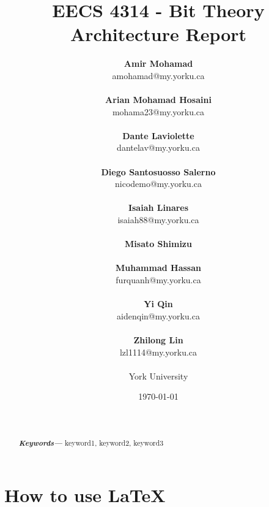 \documentclass[12pt, dvipsnames, a4paper]{article}
\providecommand{\keywords}[1]
{
  \small	
  \textbf{\textit{Keywords---}} #1
}
\begin{document}
\title{\textbf{EECS 4314 - Bit Theory\\Architecture Report}}
\date{\Large \today}
\author{
	\small \textbf{Amir Mohamad}\\ amohamad@my.yorku.ca\\\\
	\small \textbf{Arian Mohamad Hosaini}\\ mohama23@my.yorku.ca\\\\
	\small \textbf{Dante Laviolette}\\ dantelav@my.yorku.ca\\\\
	\small \textbf{Diego Santosuosso Salerno}\\ nicodemo@my.yorku.ca\\\\
	\small \textbf{Isaiah Linares}\\ isaiah88@my.yorku.ca\\\\
	\small \textbf{Misato Shimizu}\\\\
	\small \textbf{Muhammad Hassan}\\ furquanh@my.yorku.ca\\\\
	\small \textbf{Yi Qin}\\ aidenqin@my.yorku.ca\\\\
	\small \textbf{Zhilong Lin}\\ lzl1114@my.yorku.ca\\\\
	\small York University\\
}
\maketitle
\newpage
\hspace{0pt}
\vfill
\begin{abstract}
	\lipsum[1]
	\lipsum[1]
	\\\\
	\keywords{keyword1, keyword2, keyword3}
\end{abstract}
\vfill
\hspace{0pt}
\newpage
\tableofcontents
\clearpage

\section{How to use \LaTeX}
\end{document}
